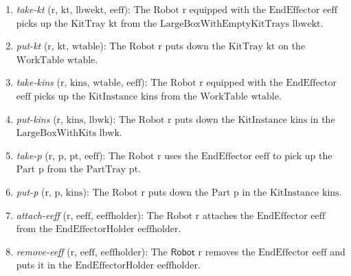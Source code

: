 \documentclass[a4paper, 10pt, conference]{ieeeconf}      %
\begin{document}
\begin{enumerate}
\item \textsl{take-kt} ($\mathrm{r}$, $\mathrm{kt}$, $\mathrm{lbwekt}$, $\mathrm{eeff}$): The $\mathrm{Robot}$ $\mathrm{r}$ equipped with the $\mathrm{EndEffector}$ $\mathrm{eeff}$ picks up the $\mathrm{KitTray}$ $\mathrm{kt}$ from the $\mathrm{LargeBoxWithEmptyKitTrays}$ $\mathrm{lbwekt}$.

\item \textsl{put-kt} ($\mathrm{r}$, $\mathrm{kt}$, $\mathrm{wtable}$): The $\mathrm{Robot}$ $\mathrm{r}$ puts down the $\mathrm{KitTray}$ $\mathrm{kt}$ on the $\mathrm{WorkTable}$ $\mathrm{wtable}$.

\item \textsl{take-kins} ($\mathrm{r}$, $\mathrm{kins}$, $\mathrm{wtable}$, $\mathrm{eeff}$): The $\mathrm{Robot}$ $\mathrm{r}$ equipped with the $\mathrm{EndEffector}$ $\mathrm{eeff}$ picks up the $\mathrm{KitInstance}$ $\mathrm{kins}$ from the $\mathrm{WorkTable}$ $\mathrm{wtable}$.

\item \textsl{put-kins} ($\mathrm{r}$, $\mathrm{kins}$, $\mathrm{lbwk}$): The $\mathrm{Robot}$ $\mathrm{r}$ puts down the $\mathrm{KitInstance}$ $\mathrm{kins}$ in the $\mathrm{LargeBoxWithKits}$ $\mathrm{lbwk}$.

\item \textsl{take-p} ($\mathrm{r}$, $\mathrm{p}$, $\mathrm{pt}$, $\mathrm{eeff}$): The $\mathrm{Robot}$ $\mathrm{r}$ uses the $\mathrm{EndEffector}$ $\mathrm{eeff}$ to pick up the $\mathrm{Part}$ $\mathrm{p}$ from the $\mathrm{PartTray}$ $\mathrm{pt}$.

\item \textsl{put-p} ($\mathrm{r}$, $\mathrm{p}$, $\mathrm{kins}$): The $\mathrm{Robot}$ $\mathrm{r}$ puts down the $\mathrm{Part}$ $\mathrm{p}$ in the $\mathrm{KitInstance}$ $\mathrm{kins}$.

\item \textsl{attach-eeff} ($\mathrm{r}$, $\mathrm{eeff}$, $\mathrm{eeffholder}$): The $\mathrm{Robot}$ $\mathrm{r}$ attaches the $\mathrm{EndEffector}$ $\mathrm{eeff}$ from the $\mathrm{EndEffectorHolder}$ $\mathrm{eeffholder}$.

\item \textsl{remove-eeff} ($\mathrm{r}$, $\mathrm{eeff}$, $\mathrm{eeffholder}$): The $\mathsf{Robot}$ $\mathrm{r}$ removes the $\mathrm{EndEffector}$ $\mathrm{eeff}$ and puts it in the $\mathrm{EndEffectorHolder}$ $\mathrm{eeffholder}$.
\end{enumerate}
\end{document}

